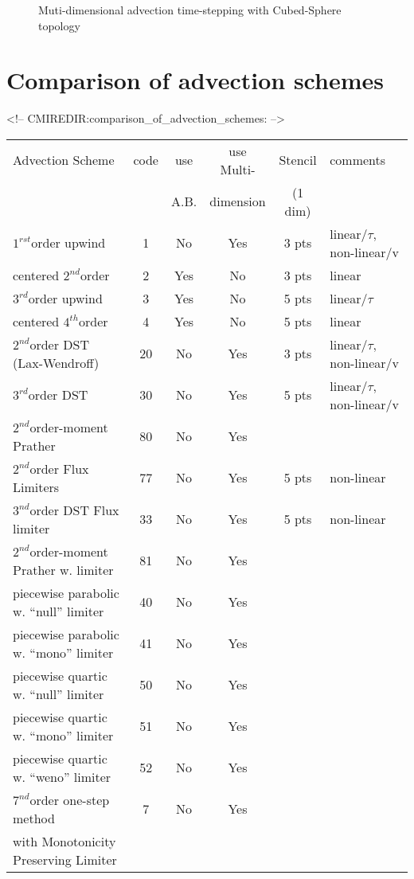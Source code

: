 \begin{figure}
\caption{Muti-dimensional advection time-stepping with Cubed-Sphere topology
\label{fig:advect-multidim_cs}
}
\end{figure}

\section{Comparison of advection schemes}
\label{sec:tracer_advection_schemes}
\begin{rawhtml}
<!-- CMIREDIR:comparison_of_advection_schemes: -->
\end{rawhtml}

\begin{table}[htb]
\centering
{\small
 \begin{tabular}[htb]{|l|c|c|c|c|l|}
   \hline
   Advection Scheme & code & use  & use Multi- & Stencil & comments \\
                    &      & A.B. & dimension & (1 dim) & \\
   \hline \hline
   $1^{rst}$order upwind  & 1 &  No & Yes & 3 pts & linear/$\tau$, non-linear/v\\
   \hline
   centered $2^{nd}$order & 2 &  Yes & No & 3 pts & linear \\
   \hline
   $3^{rd}$order upwind   & 3 &  Yes & No & 5 pts & linear/$\tau$\\
   \hline
   centered $4^{th}$order & 4 &  Yes & No & 5 pts & linear \\
   \hline \hline
   $2^{nd}$order DST (Lax-Wendroff)  & 20 &
                         No & Yes & 3 pts & linear/$\tau$, non-linear/v\\
   \hline
   $3^{rd}$order DST & 30 &  No & Yes & 5 pts & linear/$\tau$, non-linear/v\\
   \hline
   $2^{nd}$order-moment Prather & 80 & No & Yes & ~ & ~ \\
   \hline \hline
   $2^{nd}$order Flux Limiters & 77 &  No & Yes & 5 pts & non-linear \\
   \hline
   $3^{nd}$order DST Flux limiter & 33 &  No & Yes & 5 pts & non-linear \\
   \hline
   $2^{nd}$order-moment Prather w. limiter & 81 & No & Yes & ~ & ~ \\
   \hline
   piecewise parabolic w. ``null'' limiter & 40 & No & Yes & ~ & ~ \\
   \hline 
   piecewise parabolic w. ``mono'' limiter & 41 & No & Yes & ~ & ~ \\
   \hline
   piecewise quartic w. ``null'' limiter & 50 & No & Yes & ~ & ~ \\
   \hline
   piecewise quartic w. ``mono'' limiter & 51 & No & Yes & ~ & ~ \\
   \hline
   piecewise quartic w. ``weno'' limiter & 52 & No & Yes & ~ & ~ \\
   \hline
   $7^{nd}$order one-step method & 7 & No & Yes & ~ & ~ \\
   with Monotonicity Preserving Limiter & ~ & ~ & ~ & ~ & ~ \\
   \hline
   

\end{tabular}}
\end{table}
